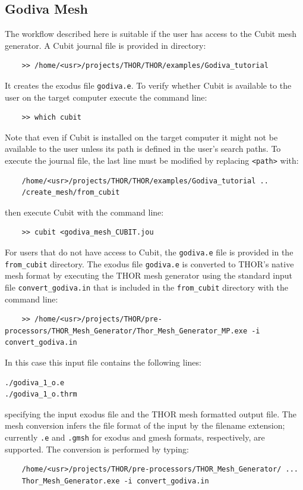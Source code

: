 \subsection{Godiva Mesh}
The workflow described here is suitable if the user has access to the Cubit mesh generator. A Cubit journal file is provided in directory:
\begin{verbatim}
    >> /home/<usr>/projects/THOR/THOR/examples/Godiva_tutorial
\end{verbatim}
It creates the exodus file \verb"godiva.e". To verify whether Cubit is available to the user on the target computer execute the command line:
\begin{verbatim}
    >> which cubit
\end{verbatim}
Note that even if Cubit is installed on the target computer it might not be available to the user unless its path is defined in the user's search paths. To execute the journal file, the last line must be modified by replacing \verb"<path>" with:
\begin{verbatim}
    /home/<usr>/projects/THOR/THOR/examples/Godiva_tutorial ..
    /create_mesh/from_cubit
\end{verbatim}
then execute Cubit with the command line:
\begin{verbatim}
    >> cubit <godiva_mesh_CUBIT.jou
\end{verbatim}
For users that do not have access to Cubit, the \verb"godiva.e" file is provided in the \verb"from_cubit" directory.
The exodus file \verb"godiva.e" is converted to THOR's native mesh format by executing the THOR mesh generator using the standard input file \verb"convert_godiva.in" that is included in the \verb"from_cubit" directory with the command line:
\begin{verbatim}
    >> /home/<usr>/projects/THOR/pre-processors/THOR_Mesh_Generator/Thor_Mesh_Generator_MP.exe -i convert_godiva.in
\end{verbatim}
In this case this input file contains the following lines:
\begin{verbatim}
./godiva_1_o.e
./godiva_1_o.thrm
\end{verbatim}
specifying the input exodus file and the THOR mesh formatted output file. The mesh conversion infers the file format of the input by the filename extension; currently \verb".e" and \verb".gmsh" for exodus and gmesh formats, respectively, are supported. The conversion is performed by typing:
\begin{verbatim}
    /home/<usr>/projects/THOR/pre-processors/THOR_Mesh_Generator/ ...
    Thor_Mesh_Generator.exe -i convert_godiva.in
\end{verbatim}
